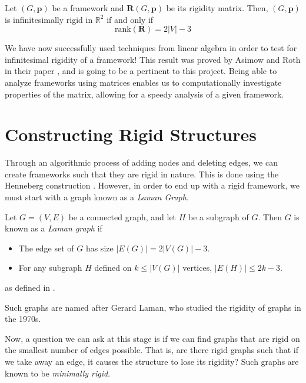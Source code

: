 \begin{theorem}
\label{thm: rank-rigid}
Let $(G,\mathbf{p})$ be a framework and $\mathbf{R}(G,\mathbf{p})$ be its rigidity matrix. Then, $(G,\mathbf{p})$ is infinitesimally rigid in $\mathbb{R}^2$ if and only if 
\[
\text{rank}(\mathbf{R}) = 2|V| - 3
\]
\end{theorem}

\begin{flushleft}
We have now successfully used techniques from linear algebra in order to test for infinitesimal rigidity of a framework! This result was proved by Asimow and Roth in their paper \cite{asimow}, and is going to be a pertinent to this project. Being able to analyze frameworks using matrices enables us to computationally investigate properties of the matrix, allowing for a speedy analysis of a given framework.
\end{flushleft}

\section{Constructing Rigid Structures}
Through an algorithmic process of adding nodes and deleting edges, we can create frameworks such that they are rigid in nature. This is done using the Henneberg construction \cite{henneberg}. However, in order to end up with a rigid framework, we must start with a graph known as a \textit{Laman Graph}.

\begin{definition}
\label{def: laman graph}
Let $G = (V,E)$ be a connected graph, and let $H$ be a subgraph of $G$. Then $G$ is known as a \textit{Laman graph} if
\begin{itemize}
    \item The edge set of $G$ has size $|E(G)| = 2|V(G)| - 3$.
    \item For any subgraph $H$ defined on $k \leq |V(G)|$ vertices, $|E(H)| \leq 2k-3$.
\end{itemize}
as defined in \cite{laman_graph}.
\end{definition}

\begin{flushleft}
Such graphs are named after Gerard Laman, who studied the rigidity of graphs in the 1970s. 

Now, a question we can ask at this stage is if we can find graphs that are rigid on the smallest number of edges possible. That is, are there rigid graphs such that if we take away an edge, it causes the structure to lose its rigidity? Such graphs are known to be \textit{minimally rigid}.
\end{flushleft}

